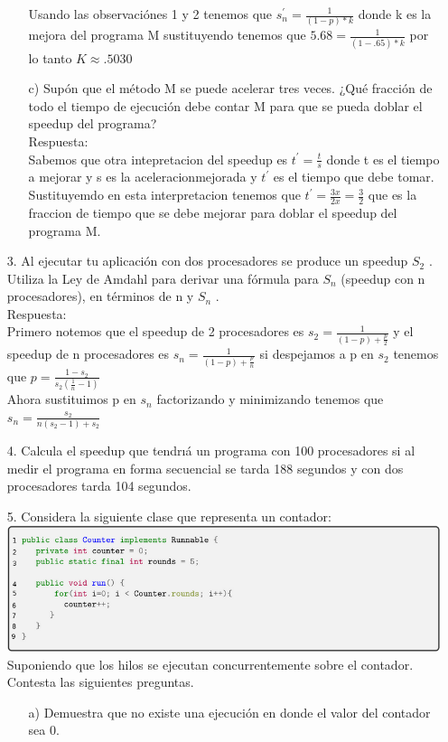 \documentclass[12pt, letterpaper]{article}
\begin{document}
\begin{itemize}
\begin{itemize}
	Usando las observaci\'ones 1 y 2 tenemos que $s_{n}^{'} =  \frac{1}{(1-p)*k}$ donde k es la mejora del programa M sustituyendo tenemos que $5.68 = \frac{1}{(1-.65)*k}$ por lo tanto $K \approx.5030$\\
	
	\item[c)]{Sup\'on que el m\'etodo M se puede acelerar tres veces. ¿Qué fracci\'on de todo el tiempo de ejecuci\'on debe contar M para que se pueda doblar el speedup del programa?}\\
	
	Respuesta:\\
	Sabemos que otra intepretacion del speedup es $t^{'} = \frac{t}{s}$ donde t es el tiempo a mejorar y s es la aceleracionmejorada y $t^{'}$ es el tiempo que debe tomar. Sustituyemdo en esta interpretacion tenemos que $t^{'} = \frac{3x}{2x} = \frac{3}{2}$ que es la fraccion de tiempo que se debe mejorar para doblar el speedup del programa M.
	
\end{itemize}

\item[3. ]Al ejecutar tu aplicaci\'on con dos procesadores se produce un speedup $S_{2}$ . Utiliza la Ley de Amdahl para derivar una f\'ormula para $S_{n}$ (speedup con n procesadores), en t\'erminos de n y $S_{n}$ .\\
Respuesta:\\
Primero notemos que el speedup de 2 procesadores es $s_{2} = \frac{1}{(1-p)+\frac{p}{2}}$ y el speedup de n procesadores es $s_{n} = \frac{1}{(1-p)+ \frac{p}{n}}$ si despejamos a p en $s_{2}$ tenemos que $p = \frac{1-s_{2}}{s_{2}(\frac{1}{n}-1)}$\\
Ahora sustituimos p en $s_{n}$ factorizando y minimizando tenemos que $s_{n}=\frac{s_{2}}{n(s_{2}-1)+s_{2}}$
\item[4. ]Calcula el speedup que tendrı\'a un programa con 100 procesadores si al medir el programa en forma secuencial se tarda 188 segundos y con dos procesadores tarda 104 segundos.

\item[5. ] Considera la siguiente clase que representa un contador:\\
\includegraphics[width=\textwidth]{Codigo5}\\
Suponiendo que los hilos se ejecutan concurrentemente sobre el contador. Contesta las siguientes preguntas.
\begin{itemize}
\item[a) ] Demuestra que no existe una ejecución en donde el valor del contador sea 0.\\


\end{itemize}
\end{itemize}
\end{document}
